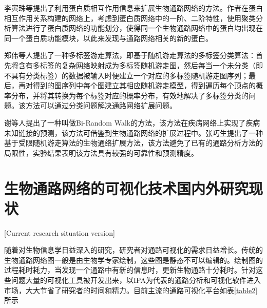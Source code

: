 李寅珠\cite{liyinzhu2012}等提出了利用蛋白质相互作用信息来扩展生物通路网络的方法。作者在蛋白相互作用关系构建的网络上，考虑到蛋白质网络中的一阶、二阶特性，使用聚类分析算法进行了蛋白质网络的功能划分，使得同一个生物通路网络中的蛋白均出现在同一个蛋白质功能模块，以此来发现与通路网络相关的新的蛋白。

郑伟\cite{zhengwei2010}等人提出了一种多标签游走算法，即基于随机游走算法的多标签分类算法：首先将含有多标签的复杂网络映射成为多标签随机游走图，然后每当一个未分类（即不具有分类标签）的数据被输入时便建立一个对应的多标签随机游走图序列；最后，再对得到的图序列中每个图建立其相应随机游走模型，得到遍历每个顶点的概率分布，并将其转换为每个标签对应的概率分布，有效地解决了多标签分类的问题。该方法可以通过分类问题解决通路网络扩展问题。

谢\cite{xie2012prioritizing}等人提出了一种叫做Bi-Random Walk的方法，该方法在疾病网络上实现了疾病未知链接的预测，该方法可借鉴到生物通路网络的扩展过程中。张巧生\cite{zhang2016network}提出了一种基于受限随机游走算法的生物通络扩展方法，该方法避免了已有的通路分析方法的局限性，实验结果表明该方法具有较强的可靠性和预测精度。

\section{生物通路网络的可视化技术国内外研究现状}[Current research situation version]

随着对生物信息学日益深入的研究，研究者对通路可视化的需求日益增长。传统的生物通路网络图一般是由生物学专家绘制，这些图是静态不可以编辑的。绘制图的过程耗时耗力，当发现一个通路中有新的信息时，更新生物通路十分耗时。针对这些问题大量的可视化工具被开发出来，以IPA为代表的通路分析和可视化软件进入市场，大大节省了研究者的时间和精力。目前主流的通路可视化平台如表\ref{table2}所示

